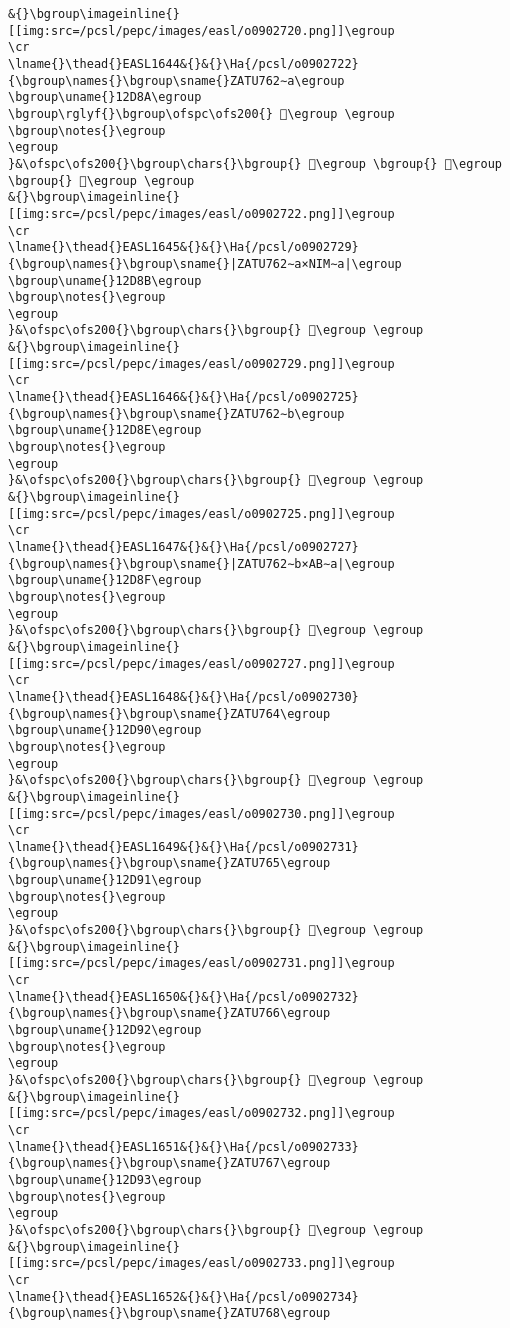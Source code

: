 \begin{verbatim}
&{}\bgroup\imageinline{}[[img:src=/pcsl/pepc/images/easl/o0902720.png]]\egroup
\cr
\lname{}\thead{}EASL1644&{}&{}\Ha{/pcsl/o0902722}{\bgroup\names{}\bgroup\sname{}ZATU762∼a\egroup
\bgroup\uname{}12D8A\egroup
\bgroup\rglyf{}\bgroup\ofspc\ofs200{} 𒶊\egroup \egroup
\bgroup\notes{}\egroup
\egroup
}&\ofspc\ofs200{}\bgroup\chars{}\bgroup{} 𒶍\egroup \bgroup{} 𒶌\egroup \bgroup{} 𒶊\egroup \egroup
&{}\bgroup\imageinline{}[[img:src=/pcsl/pepc/images/easl/o0902722.png]]\egroup
\cr
\lname{}\thead{}EASL1645&{}&{}\Ha{/pcsl/o0902729}{\bgroup\names{}\bgroup\sname{}|ZATU762∼a×NIM∼a|\egroup
\bgroup\uname{}12D8B\egroup
\bgroup\notes{}\egroup
\egroup
}&\ofspc\ofs200{}\bgroup\chars{}\bgroup{} 𒶋\egroup \egroup
&{}\bgroup\imageinline{}[[img:src=/pcsl/pepc/images/easl/o0902729.png]]\egroup
\cr
\lname{}\thead{}EASL1646&{}&{}\Ha{/pcsl/o0902725}{\bgroup\names{}\bgroup\sname{}ZATU762∼b\egroup
\bgroup\uname{}12D8E\egroup
\bgroup\notes{}\egroup
\egroup
}&\ofspc\ofs200{}\bgroup\chars{}\bgroup{} 𒶎\egroup \egroup
&{}\bgroup\imageinline{}[[img:src=/pcsl/pepc/images/easl/o0902725.png]]\egroup
\cr
\lname{}\thead{}EASL1647&{}&{}\Ha{/pcsl/o0902727}{\bgroup\names{}\bgroup\sname{}|ZATU762∼b×AB∼a|\egroup
\bgroup\uname{}12D8F\egroup
\bgroup\notes{}\egroup
\egroup
}&\ofspc\ofs200{}\bgroup\chars{}\bgroup{} 𒶏\egroup \egroup
&{}\bgroup\imageinline{}[[img:src=/pcsl/pepc/images/easl/o0902727.png]]\egroup
\cr
\lname{}\thead{}EASL1648&{}&{}\Ha{/pcsl/o0902730}{\bgroup\names{}\bgroup\sname{}ZATU764\egroup
\bgroup\uname{}12D90\egroup
\bgroup\notes{}\egroup
\egroup
}&\ofspc\ofs200{}\bgroup\chars{}\bgroup{} 𒶐\egroup \egroup
&{}\bgroup\imageinline{}[[img:src=/pcsl/pepc/images/easl/o0902730.png]]\egroup
\cr
\lname{}\thead{}EASL1649&{}&{}\Ha{/pcsl/o0902731}{\bgroup\names{}\bgroup\sname{}ZATU765\egroup
\bgroup\uname{}12D91\egroup
\bgroup\notes{}\egroup
\egroup
}&\ofspc\ofs200{}\bgroup\chars{}\bgroup{} 𒶑\egroup \egroup
&{}\bgroup\imageinline{}[[img:src=/pcsl/pepc/images/easl/o0902731.png]]\egroup
\cr
\lname{}\thead{}EASL1650&{}&{}\Ha{/pcsl/o0902732}{\bgroup\names{}\bgroup\sname{}ZATU766\egroup
\bgroup\uname{}12D92\egroup
\bgroup\notes{}\egroup
\egroup
}&\ofspc\ofs200{}\bgroup\chars{}\bgroup{} 𒶒\egroup \egroup
&{}\bgroup\imageinline{}[[img:src=/pcsl/pepc/images/easl/o0902732.png]]\egroup
\cr
\lname{}\thead{}EASL1651&{}&{}\Ha{/pcsl/o0902733}{\bgroup\names{}\bgroup\sname{}ZATU767\egroup
\bgroup\uname{}12D93\egroup
\bgroup\notes{}\egroup
\egroup
}&\ofspc\ofs200{}\bgroup\chars{}\bgroup{} 𒶓\egroup \egroup
&{}\bgroup\imageinline{}[[img:src=/pcsl/pepc/images/easl/o0902733.png]]\egroup
\cr
\lname{}\thead{}EASL1652&{}&{}\Ha{/pcsl/o0902734}{\bgroup\names{}\bgroup\sname{}ZATU768\egroup

\end{verbatim}
